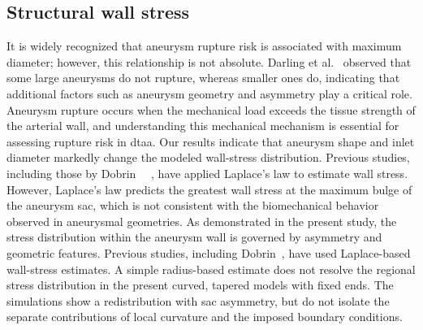 \documentclass[12pt,a4paper]{article}
\newcommand{\cfdrevision}[1]{#1} %
\newcommand{\DTAA}{\ac{dtaa}\xspace}
\theoremstyle{definition}
\numberwithin{equation}{section}
\providecommand{\DIFaddtex}[1]{{\protect\color{blue} \sf #1}} %
\providecommand{\DIFdeltex}[1]{{\protect\color{red} \scriptsize #1}} %
\providecommand{\DIFaddbegin}{} %
\providecommand{\DIFaddend}{} %
\providecommand{\DIFdelbegin}{} %
\providecommand{\DIFdelend}{} %
\providecommand{\DIFadd}[1]{\texorpdfstring{\DIFaddtex{#1}}{#1}} %
\providecommand{\DIFdel}[1]{\texorpdfstring{\DIFdeltex{#1}}{}} %
\newcommand{\DIFscaledelfig}{0.5}
\newlength{\DIFdelgraphicswidth} %
\newlength{\DIFdelgraphicsheight} %
\newcommand{\DIFaddincludegraphics}[2][]{{\color{blue}\fbox{\DIFOincludegraphics[#1]{#2}}}} %
\newcommand{\DIFdelincludegraphics}[2][]{%
\sbox{\DIFdelgraphicsbox}{\DIFOincludegraphics[#1]{#2}}%
\settoboxwidth{\DIFdelgraphicswidth}{\DIFdelgraphicsbox} %
\settoboxtotalheight{\DIFdelgraphicsheight}{\DIFdelgraphicsbox} %
\scalebox{\DIFscaledelfig}{%
\parbox[b]{\DIFdelgraphicswidth}{\usebox{\DIFdelgraphicsbox}\\[-\baselineskip] \rule{\DIFdelgraphicswidth}{0em}}\llap{\resizebox{\DIFdelgraphicswidth}{\DIFdelgraphicsheight}{%
\setlength{\unitlength}{\DIFdelgraphicswidth}%
\begin{picture}(1,1)%
\thicklines\linethickness{2pt} %
{\color[rgb]{1,0,0}\put(0,0){\framebox(1,1){}}}%
{\color[rgb]{1,0,0}\put(0,0){\line( 1,1){1}}}%
{\color[rgb]{1,0,0}\put(0,1){\line(1,-1){1}}}%
\end{picture}%
}\hspace*{3pt}}} %
} %
\DeclareRobustCommand{\DIFaddbegin}{\DIFOaddbegin \let\includegraphics\DIFaddincludegraphics} %
\DeclareRobustCommand{\DIFaddend}{\DIFOaddend \let\includegraphics\DIFOincludegraphics} %
\DeclareRobustCommand{\DIFdelbegin}{\DIFOdelbegin \let\includegraphics\DIFdelincludegraphics} %
\DeclareRobustCommand{\DIFdelend}{\DIFOaddend \let\includegraphics\DIFOincludegraphics} %
\begin{document}
\DIFdelend \subsection{Structural wall stress}
\label{sec:structural}

It is widely recognized that aneurysm rupture risk is associated with maximum diameter; however, this relationship is not absolute. Darling et al.~\cite{darling1977autopsy} observed that some large aneurysms do not rupture, whereas smaller ones do, indicating that additional factors such as aneurysm geometry and asymmetry play a critical role. Aneurysm rupture occurs when the mechanical load exceeds the tissue strength of the arterial wall, and understanding this mechanical mechanism is essential for assessing rupture risk in \DTAA. Our results indicate that aneurysm shape and inlet diameter markedly change the modeled wall-stress distribution. \DIFdelbegin \DIFdel{Previous studies, including those by Dobrin~\mbox{%
\cite{dobrin1989pathophysiology}}\hskip0pt%
, have applied Laplace's law to estimate wall stress. However, Laplace's law predicts the greatest wall stress at the maximum bulge of the aneurysm sac, which is not consistent with the biomechanical behavior observed in aneurysmal geometries. As demonstrated in the present study, the stress distribution within the aneurysm wall is governed by asymmetry and geometric features.
}\DIFdelend \DIFaddbegin \DIFadd{\cfdrevision{Previous studies, including Dobrin~\cite{dobrin1989pathophysiology}, have used Laplace-based wall-stress estimates. A simple radius-based estimate does not resolve the regional stress distribution in the present curved, tapered models with fixed ends. The simulations show a redistribution with sac asymmetry, but do not isolate the separate contributions of local curvature and the imposed boundary conditions.}
}\DIFaddend 
\end{document}
